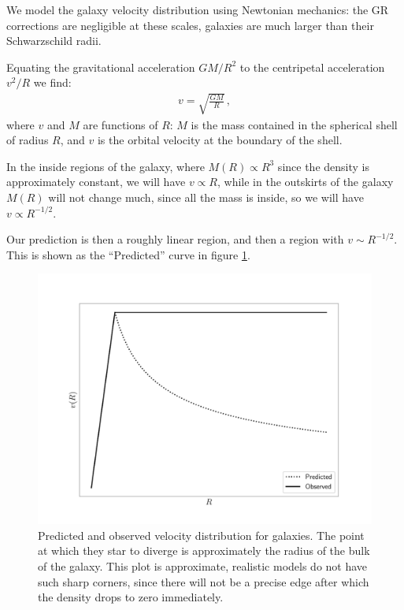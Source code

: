 \documentclass[main.tex]{subfiles}
\begin{document}
We model the galaxy velocity distribution using Newtonian mechanics: the GR corrections are negligible at these scales, galaxies are much larger than their Schwarzschild radii.

Equating the gravitational acceleration \(GM/R^2\) to the centripetal acceleration \(v^2 /R\) we find: 
%
\begin{align}
v = \sqrt{\frac{GM}{R}}
\,,
\end{align}
%
where \(v\) and \(M\) are functions of \(R\): \(M\) is the mass contained in the spherical shell of radius \(R\), and \(v\) is the orbital velocity at the boundary of the shell.

In the inside regions of the galaxy, where \(M(R) \propto R^3\) since the density is approximately constant, we will have \(v \propto R\), while in the outskirts of the galaxy \(M(R)\) will not change much, since all the mass is inside, so we will have \(v \propto R^{-1/2}\).

Our prediction is then a roughly linear region, and then a region with \(v \sim R^{-1/2}\).
This is shown as the ``Predicted'' curve in figure \ref{fig:dark_matter}.

\begin{figure}[ht]
\centering
\includegraphics[width=\textwidth]{figures/Dark_matter.pdf}
\caption{Predicted and observed velocity distribution for galaxies. The point at which they star to diverge is approximately the radius of the bulk of the galaxy. This plot is approximate, realistic models do not have such sharp corners, since there will not be a precise edge after which the density drops to zero immediately.}
\label{fig:dark_matter}
\end{figure}  
\end{document}
